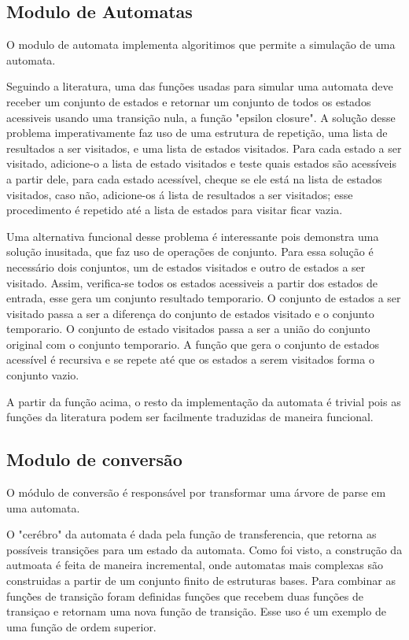 \subsection{Modulo de Automatas}
O modulo de automata implementa algoritimos que permite a simulação de uma automata.

Seguindo a literatura, uma das funções usadas para simular uma automata deve receber um conjunto de estados e retornar um conjunto de todos os estados acessiveis usando uma transição nula, a função "epsilon closure".
A soluçã̀o desse problema imperativamente faz uso de uma estrutura de repetição, uma lista de resultados a ser visitados, e uma lista de estados visitados.
Para cada estado a ser visitado, adicione-o a lista de estado visitados e teste quais estados são acessíveis a partir dele, para cada estado acessível, cheque se ele está na lista de estados visitados, caso não, adicione-os á lista de resultados a ser visitados; esse procedimento é repetido até a lista de estados para visitar ficar vazia.

Uma alternativa funcional desse problema é interessante pois demonstra uma solução inusitada, que faz uso de operações de conjunto.
Para essa solução é necessário dois conjuntos, um de estados visitados e outro de estados a ser visitado.
Assim, verifica-se todos os estados acessiveis a partir dos estados de entrada, esse gera um conjunto resultado temporario.
O conjunto de estados a ser visitado passa a ser a diferença do conjunto de estados visitado e o conjunto temporario.
O conjunto de estado visitados passa a ser a união do conjunto original com o conjunto temporario.
A função que gera o conjunto de estados acessível é recursiva e se repete até que os estados a serem visitados forma o conjunto vazio.

A partir da função acima, o resto da implementação da automata é trivial pois as funções da literatura podem ser facilmente traduzidas de maneira funcional.

\subsection{Modulo de conversão}
O módulo de conversão é responsável por transformar uma árvore de parse em uma automata.

O "cerébro" da automata é dada pela função de transferencia, que retorna as possíveis transições para um estado da automata.
Como foi visto, a construção da autmoata é feita de maneira incremental, onde automatas mais complexas são construidas a partir de um conjunto finito de estruturas bases.
Para combinar as funçõ̀es de transição foram definidas funções que recebem duas funções de transiçao e retornam uma nova função de transição.
Esse uso é um exemplo de uma função de ordem superior.

